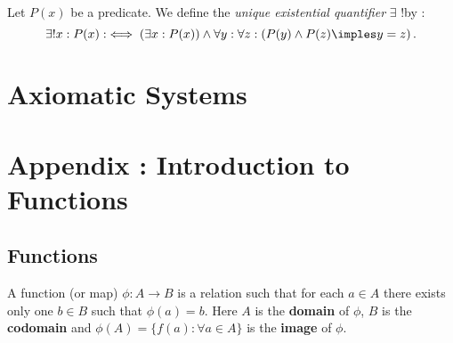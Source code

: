 \documentclass[a4paper]{article}
\begin{document}
\begin{definition}
	Let $P(x)$ be a predicate. We define the \textit{unique existential quantifier} $\exists$ !by :
\[
\exists ! x : P(x) : \iff \left( \exists x : P(x) \right) \land \forall y : \forall z : \left( P(y) \land P(z) \imples y = z \right) 
.\] 
\end{definition}

\section{Axiomatic Systems}





















































\section{Appendix : Introduction to Functions}
\subsection{Functions}

\begin{definition}
	A function (or map) $\phi: A \to B$ is a relation such that for each $a \in A$ there exists only one $b \in B$ such that $\phi(a) = b$. Here $A$ is the \textbf{domain} of $\phi$, $B$ is the \textbf{codomain} and $\phi(A) = \{ f(a) : \forall a \in A \} $ is the \textbf{image} of $\phi$.
\end{definition}


\end{document}
